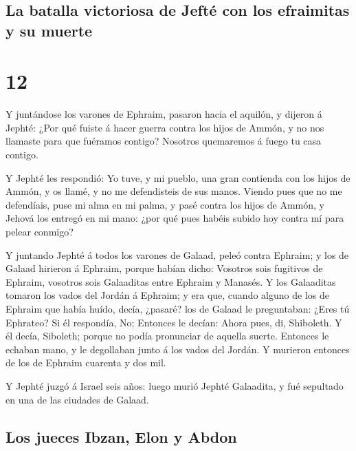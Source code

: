 \hypertarget{la-batalla-victoriosa-de-jeftuxe9-con-los-efraimitas-y-su-muerte}{%
\subsection{La batalla victoriosa de Jefté con los efraimitas y su
muerte}\label{la-batalla-victoriosa-de-jeftuxe9-con-los-efraimitas-y-su-muerte}}

\hypertarget{section-07-12}{%
\section{12}\label{section-07-12}}

 Y juntándose los varones de Ephraim, pasaron hacia el
aquilón, y dijeron á Jephté: ¿Por qué fuiste á hacer guerra contra los
hijos de Ammón, y no nos llamaste para que fuéramos contigo? Nosotros
quemaremos á fuego tu casa contigo.

 Y Jephté les respondió: Yo tuve, y mi pueblo, una gran
contienda con los hijos de Ammón, y os llamé, y no me defendisteis de
sus manos.  Viendo pues que no me defendíais, puse mi alma
en mi palma, y pasé contra los hijos de Ammón, y Jehová los entregó en
mi mano: ¿por qué pues habéis subido hoy contra mí para pelear conmigo?

 Y juntando Jephté á todos los varones de Galaad, peleó
contra Ephraim; y los de Galaad hirieron á Ephraim, porque habían dicho:
Vosotros sois fugitivos de Ephraim, vosotros sois Galaaditas entre
Ephraim y Manasés.  Y los Galaaditas tomaron los vados del
Jordán á Ephraim; y era que, cuando alguno de los de Ephraim que había
huído, decía, ¿pasaré? los de Galaad le preguntaban: ¿Eres tú Ephrateo?
Si él respondía, No;  Entonces le decían: Ahora pues, di,
Shiboleth. Y él decía, Siboleth; porque no podía pronunciar de aquella
suerte. Entonces le echaban mano, y le degollaban junto á los vados del
Jordán. Y murieron entonces de los de Ephraim cuarenta y dos mil.

 Y Jephté juzgó á Israel seis años: luego murió Jephté
Galaadita, y fué sepultado en una de las ciudades de Galaad.

\hypertarget{los-jueces-ibzan-elon-y-abdon}{%
\subsection{Los jueces Ibzan, Elon y
Abdon}\label{los-jueces-ibzan-elon-y-abdon}}

